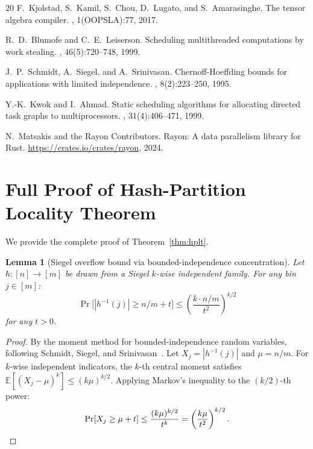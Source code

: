 \documentclass[11pt]{article}
\newtheorem{lemma}[theorem]{Lemma}
\begin{document}
\begin{thebibliography}{20}
F.~Kjolstad, S.~Kamil, S.~Chou, D.~Lugato, and S.~Amarasinghe.
\newblock The tensor algebra compiler.
, 1(OOPSLA):77, 2017.

R.~D.~Blumofe and C.~E.~Leiserson.
\newblock Scheduling multithreaded computations by work stealing.
, 46(5):720--748, 1999.

J.~P.~Schmidt, A.~Siegel, and A.~Srinivasan.
\newblock Chernoff-Hoeffding bounds for applications with limited independence.
, 8(2):223--250, 1995.

Y.-K.~Kwok and I.~Ahmad.
\newblock Static scheduling algorithms for allocating directed task graphs to
  multiprocessors.
, 31(4):406--471, 1999.

N.~Matsakis and the Rayon Contributors.
\newblock Rayon: A data parallelism library for Rust.
\newblock \url{https://crates.io/crates/rayon}, 2024.

\end{thebibliography}

\appendix

\section{Full Proof of Hash-Partition Locality Theorem}
\label{app:proofs}

We provide the complete proof of Theorem~\ref{thm:hplt}.

\begin{lemma}[Siegel overflow bound via bounded-independence concentration]
\label{lem:siegel_overflow}
Let $h: [n] \to [m]$ be drawn from a Siegel $k$-wise independent family.
For any bin $j \in [m]$:
\[
  \Pr\bigl[|h^{-1}(j)| \ge n/m + t\bigr] \le \left(\frac{k \cdot n/m}{t^2}\right)^{k/2}
\]
for any $t > 0$.
\end{lemma}

\begin{proof}
By the moment method for bounded-independence random variables,
following Schmidt, Siegel, and Srinivasan~\cite{schmidt1995chernoff}.
Let $X_j = |h^{-1}(j)|$ and $\mu = n/m$.  For $k$-wise independent
indicators, the $k$-th central moment satisfies
$\mathbb{E}[(X_j - \mu)^k] \le (k\mu)^{k/2}$.
Applying Markov's inequality to the $(k/2)$-th power:
\[
  \Pr[X_j \ge \mu + t] \le \frac{(k\mu)^{k/2}}{t^{k}}
  = \left(\frac{k\mu}{t^2}\right)^{k/2}. \qedhere
\]
\end{proof}
\end{document}
